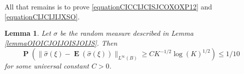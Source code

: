 \documentclass[dvipsnames,letterpaper,12pt]{article}
\numberwithin{equation}{section}
\newtheorem{lemma}[theorem]{Lemma}
\numberwithin{theorem}{section}
\DeclareMathOperator{\EE}{\mathbf{E}}
\DeclareMathOperator{\PP}{\mathbf{P}}
\begin{document}
All that remains is to prove \eqref{equationCICCIJCISJCOXOXP12} and \eqref{equationCIJCIJIJXSO}.

\begin{lemma} \label{lemma24901401921209}
    Let $\sigma$ be the random measure described in Lemma \ref{lemmaOIOICJOIJOISJOIJS}. Then
    \[ \PP \left( \| \widehat{\sigma}(\xi) - \EE(\widehat{\sigma}(\xi)) \|_{L^\infty(B)} \geq C K^{-1/2} \log(K)^{1/2} \right) \leq 1/10 \]
    for some universal constant $C > 0$.
\end{lemma}

\end{document}
